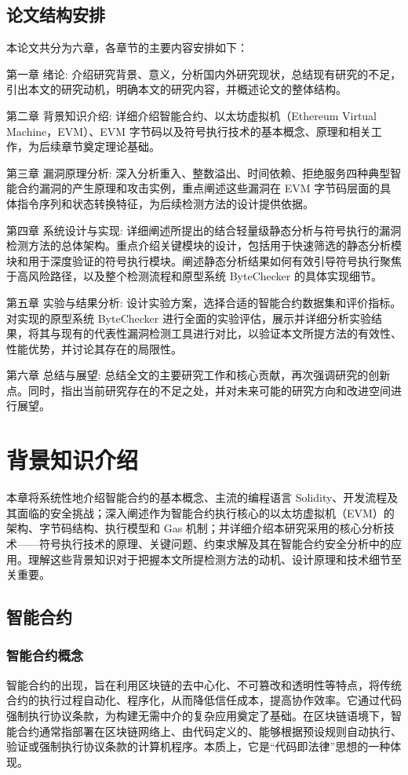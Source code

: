 \documentclass[print, master, vlined, timesmath]{DissertUESTC}
\begin{document}
\section{论文结构安排}


本论文共分为六章，各章节的主要内容安排如下：

第一章 绪论: 介绍研究背景、意义，分析国内外研究现状，总结现有研究的不足，引出本文的研究动机，明确本文的研究内容，并概述论文的整体结构。

第二章 背景知识介绍: 详细介绍智能合约、以太坊虚拟机（Ethereum Virtual Machine，EVM）、EVM 字节码以及符号执行技术的基本概念、原理和相关工作，为后续章节奠定理论基础。

第三章 漏洞原理分析: 深入分析重入、整数溢出、时间依赖、拒绝服务四种典型智能合约漏洞的产生原理和攻击实例，重点阐述这些漏洞在 EVM 字节码层面的具体指令序列和状态转换特征，为后续检测方法的设计提供依据。

第四章 系统设计与实现: 详细阐述所提出的结合轻量级静态分析与符号执行的漏洞检测方法的总体架构。重点介绍关键模块的设计，包括用于快速筛选的静态分析模块和用于深度验证的符号执行模块。阐述静态分析结果如何有效引导符号执行聚焦于高风险路径，以及整个检测流程和原型系统 ByteChecker 的具体实现细节。

第五章 实验与结果分析: 设计实验方案，选择合适的智能合约数据集和评价指标。对实现的原型系统 ByteChecker 进行全面的实验评估，展示并详细分析实验结果，将其与现有的代表性漏洞检测工具进行对比，以验证本文所提方法的有效性、性能优势，并讨论其存在的局限性。

第六章 总结与展望: 总结全文的主要研究工作和核心贡献，再次强调研究的创新点。同时，指出当前研究存在的不足之处，并对未来可能的研究方向和改进空间进行展望。


\chapter{背景知识介绍}
本章将系统性地介绍智能合约的基本概念、主流的编程语言 Solidity、开发流程及其面临的安全挑战；深入阐述作为智能合约执行核心的以太坊虚拟机（EVM）的架构、字节码结构、执行模型和 Gas 机制；并详细介绍本研究采用的核心分析技术——符号执行技术的原理、关键问题、约束求解及其在智能合约安全分析中的应用。理解这些背景知识对于把握本文所提检测方法的动机、设计原理和技术细节至关重要。

\section{智能合约}


\subsection{智能合约概念}
智能合约的出现，旨在利用区块链的去中心化、不可篡改和透明性等特点，将传统合约的执行过程自动化、程序化，从而降低信任成本，提高协作效率\textsuperscript{\cite{AttackingDeFi_2021a}}。它通过代码强制执行协议条款，为构建无需中介的复杂应用奠定了基础。在区块链语境下，智能合约通常指部署在区块链网络上、由代码定义的、能够根据预设规则自动执行、验证或强制执行协议条款的计算机程序。本质上，它是“代码即法律”思想的一种体现。
\end{document}
